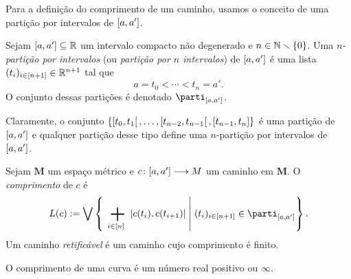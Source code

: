 Para a definição do comprimento de um caminho, usamos o conceito de uma partição por intervalos de $\left[{a},{a'}\right]$.

\begin{definition}
Sejam $\left[{a},{a'}\right] \subseteq \mathbb{R}$ um intervalo compacto não degenerado e $n \in \mathbb{N} \smallsetminus \{0\}$. Uma \emph{$n$-partição por intervalos} (ou \emph{partição por $n$ intervalos}) de $\left[{a},{a'}\right]$ é uma lista $(t_i)_{i \in [n+1]} \in \mathbb{R}^{n+1}$ tal que
	\begin{equation*}
	a = t_0 < \cdots < t_n = a'.
	\end{equation*}
O conjunto dessas partições é denotado $\parti_{\intff{a}{a'}}$.
\end{definition}

Claramente, o conjunto $\{\left[{t_0},{t_1}\right[,\ldots,\left[{t_{n-2}},{t_{n-1}}\right[,\left[{t_{n-1}},{t_{n}}\right]\}$ é uma partição de $\left[{a},{a'}\right]$ e qualquer partição desse tipo define uma $n$-partição por intervalos de $\left[{a},{a'}\right]$.

\begin{definition}
Sejam $\bm M$ um espaço métrico e ${c}\colon {\left[{a},{a'}\right]} \longrightarrow {M}$ um caminho em $\bm M$. O \emph{comprimento} de $c$ é
	\begin{equation*}
	\compr{c} := \sup\set{\sum_{i \in [n]} \dist{c(t_i)}{c(t_{i+1})}}{(t_i)_{i \in [n+1]} \in \parti_{\intff{a}{a'}}}.
	\end{equation*}
Um caminho \emph{retificável} é um caminho cujo comprimento é finito.
\end{definition}

O comprimento de uma curva é um número real positivo ou $\infty$.

